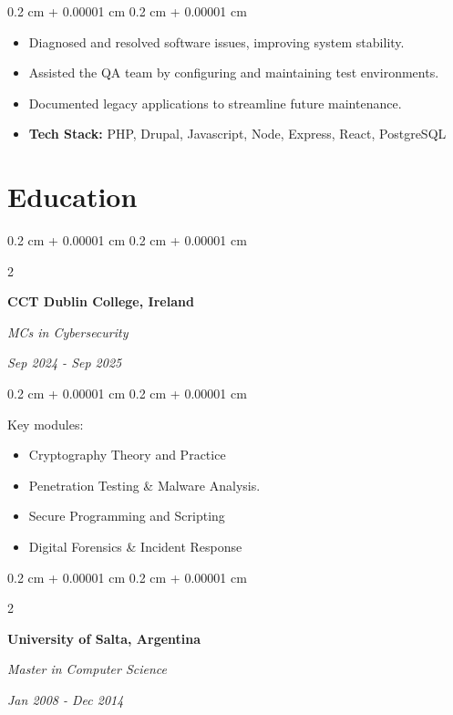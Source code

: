 \documentclass[10pt, letterpaper]{article}
\newenvironment{highlights}{
    \begin{itemize}[
        topsep=0.10 cm,
        parsep=0.10 cm,
        partopsep=0pt,
        itemsep=0pt,
        leftmargin=0.4 cm + 10pt
    ]
}{
    \end{itemize}
} %
\newenvironment{onecolentry}{
    \begin{adjustwidth}{
        0.2 cm + 0.00001 cm
    }{
        0.2 cm + 0.00001 cm
    }
}{
    \end{adjustwidth}
} %
\newenvironment{twocolentry}[2][]{
    \onecolentry
    \def\secondColumn{#2}
    \setcolumnwidth{\fill, 4.5 cm}
    \begin{paracol}{2}
}{
    \switchcolumn \raggedleft \secondColumn
    \end{paracol}
    \endonecolentry
} %
\begin{document}
        \vspace{0.10 cm}
        \begin{onecolentry}
            \begin{highlights}
                \item Diagnosed and resolved software issues, improving system stability.
                \item Assisted the QA team by configuring and maintaining test environments.
                \item Documented legacy applications to streamline future maintenance.
                \item \textbf{Tech Stack:} PHP, Drupal, Javascript, Node, Express, React, PostgreSQL
            \end{highlights}
        \end{onecolentry}



    \section{Education}


        \begin{twocolentry}{
        \textit{Sep 2024 - Sep 2025}}
            \textbf{CCT Dublin College, Ireland}

            \textit{MCs in Cybersecurity}
        \end{twocolentry}

        \vspace{0.10 cm}
        \begin{onecolentry}
        Key modules:
            \begin{highlights}
                \item Cryptography Theory and Practice
                \item Penetration Testing \& Malware Analysis.
                \item Secure Programming and Scripting
                \item Digital Forensics \& Incident Response
            \end{highlights}
        \end{onecolentry}

        
        \begin{twocolentry}{
        \textit{Jan 2008 - Dec 2014}}
            \textbf{University of Salta, Argentina}

            \textit{Master in Computer Science}
        \end{twocolentry}
\end{document}
